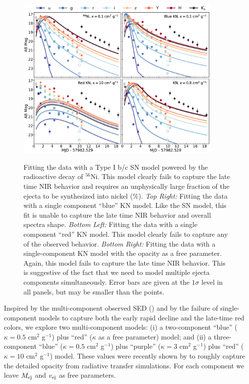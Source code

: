 \begin{figure}
\begin{center}
\hspace*{-0.1in}
\scalebox{1.}
{\includegraphics[width=0.9\textwidth]{./figs/chapter5/lc_failed_alt.pdf}}
\caption{ Fitting the data with a Type I b/c SN model powered by the radioactive decay of $^{56}$Ni. This model clearly fails to capture the late time NIR behavior and requires an unphysically large fraction of the ejecta to be synthesized into nickel (\%). {\it Top Right:} Fitting the data with a single component ``blue'' KN model. Like the SN model, this fit is unable to capture the late time NIR behavior and overall spectra shape. {\it Bottom Left:} Fitting the data with a single component ``red'' KN model. This model clearly fails to capture any of the observed behavior. {\it Bottom Right:} Fitting the data with a single-component KN model with the opacity as a free parameter. Again, this model fails to capture the late time NIR behavior. This is suggestive of the fact that we need to model multiple ejecta components simultaneously. Error bars are given at the $1\sigma$ level in all panels, but may be smaller than the points.}
\label{fig:ch5_lc_failed}
\end{center}
\end{figure}

\clearpage
Inspired by the multi-component observed SED () and by the failure of single-component models to capture both the early rapid decline and the late-time red colors, we explore two multi-component models: (i) a two-component ``blue'' ($\kappa = 0.5$ cm$^{2}$ g$^{-1}$) plus ``red'' ($\kappa$ as a free parameter) model; and (ii) a three-component ``blue'' ($\kappa = 0.5$ cm$^{2}$ g$^{-1}$) plus ``purple'' ($\kappa = 3$ cm$^{2}$ g$^{-1}$) plus ``red'' ($\kappa = 10$ cm$^{2}$ g$^{-1}$) model. These values were recently shown by \citet{Tanaka+18} to roughly capture the detailed opacity from radiative transfer simulations. For each component we leave $M_{\rm ej}$ and $v_{\rm ej}$ as free parameters.

